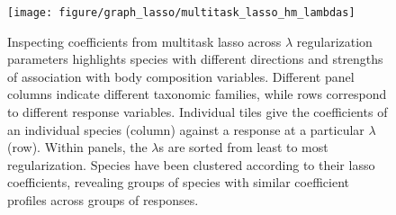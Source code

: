 \documentclass{article}
\begin{document}

\begin{figure}
  \centering
  \texttt{[image: figure/graph\_lasso/multitask\_lasso\_hm\_lambdas]}
  \caption{ Inspecting coefficients from multitask lasso across $\lambda$
    regularization parameters highlights species with different directions and
    strengths of association with body composition variables. Different panel
    columns indicate different taxonomic families, while rows correspond to
    different response variables. Individual tiles give the coefficients of an
    individual species (column) against a response at a particular $\lambda$
    (row). Within panels, the $\lambda$s are sorted from least to most
    regularization. Species have been clustered according to their lasso
    coefficients, revealing groups of species with similar coefficient profiles
    across groups of responses.
    \label{fig:graph_lasso_multitask_lasso_hm_lambdas} }
\end{figure}


\end{document}
